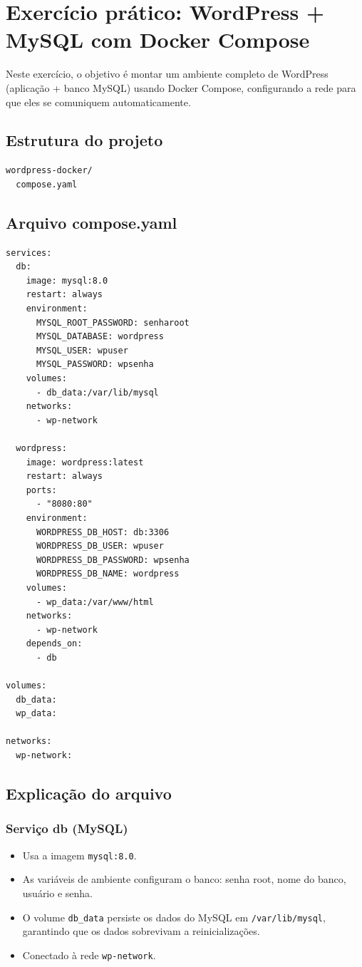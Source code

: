 \section{Exercício prático: WordPress + MySQL com Docker Compose}

Neste exercício, o objetivo é montar um ambiente completo de WordPress (aplicação + banco MySQL) usando Docker Compose, configurando a rede para que eles se comuniquem automaticamente.

\subsection{Estrutura do projeto}

\begin{verbatim}
wordpress-docker/
  compose.yaml
\end{verbatim}

\subsection{Arquivo compose.yaml}

\begin{verbatim}
services:
  db:
    image: mysql:8.0
    restart: always
    environment:
      MYSQL_ROOT_PASSWORD: senharoot
      MYSQL_DATABASE: wordpress
      MYSQL_USER: wpuser
      MYSQL_PASSWORD: wpsenha
    volumes:
      - db_data:/var/lib/mysql
    networks:
      - wp-network

  wordpress:
    image: wordpress:latest
    restart: always
    ports:
      - "8080:80"
    environment:
      WORDPRESS_DB_HOST: db:3306
      WORDPRESS_DB_USER: wpuser
      WORDPRESS_DB_PASSWORD: wpsenha
      WORDPRESS_DB_NAME: wordpress
    volumes:
      - wp_data:/var/www/html
    networks:
      - wp-network
    depends_on:
      - db

volumes:
  db_data:
  wp_data:

networks:
  wp-network:
\end{verbatim}

\subsection{Explicação do arquivo}

\subsubsection{Serviço db (MySQL)}

\begin{itemize}
    \item Usa a imagem \texttt{mysql:8.0}.
    \item As variáveis de ambiente configuram o banco: senha root, nome do banco, usuário e senha.
    \item O volume \texttt{db\_data} persiste os dados do MySQL em \texttt{/var/lib/mysql}, garantindo que os dados sobrevivam a reinicializações.
    \item Conectado à rede \texttt{wp-network}.
\end{itemize}

